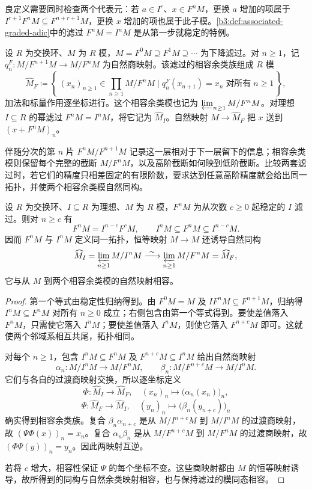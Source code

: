 良定义需要同时检查两个代表元：若 \(a\in I^r\)、\(x\in F^nM\)，更换 \(a\) 增加的项属于 \(I^{r+1}F^nM\subseteq F^{n+r+1}M\)，更换 \(x\) 增加的项也属于此子模。\cref{b3:def:associated-graded-adic}中的滤过 \(F^nM=I^nM\) 是从第一步就稳定的特例。

\begin{definition}\label{b3:def:filtered-completion}
	设 \(R\) 为交换环、\(M\) 为 \(R\) 模，\(M=F^0M\supseteq F^1M\supseteq\cdots\) 为下降滤过。对 \(n\ge1\)，记 \(q^F_n:M/F^{n+1}M\rightarrow M/F^nM\) 为自然商映射。该滤过的相容余类族组成 \(R\) 模
	\[
		\widehat M_F\coloneqq \left\{\,(x_n)_{n\ge1}\in\prod_{n\ge1}M/F^nM \mid q^F_n(x_{n+1})=x_n\;\text{对所有}\;n\ge1\,\right\},
	\]
	加法和标量作用逐坐标进行。这个相容余类模也记为 \(\varprojlim_{n\ge1}M/F^nM\)。对理想 \(I\subseteq R\) 的幂滤过 \(F^nM=I^nM\)，将它记为 \(\widehat M_I\)。自然映射 \(M\rightarrow\widehat M_F\) 把 \(x\) 送到 \((x+F^nM)_n\)。
\end{definition}

伴随分次的第 \(n\) 片 \(F^nM/F^{n+1}M\) 记录这一层相对于下一层留下的信息；相容余类模则保留每个完整的截断 \(M/F^nM\)，以及高阶截断如何映到低阶截断。比较两套滤过时，若它们的精度只相差固定的有限阶数，要求达到任意高阶精度就会给出同一拓扑，并使两个相容余类模自然同构。

\begin{proposition}\label{b3:prop:stable-filtration-equivalent}
	设 \(R\) 为交换环、\(I\subseteq R\) 为理想、\(M\) 为 \(R\) 模，\(F^nM\) 为从次数 \(c\ge0\) 起稳定的 \(I\) 滤过。则对 \(n\ge c\) 有
	\[
		F^nM=I^{n-c}F^cM,\qquad I^nM\subseteq F^nM\subseteq I^{n-c}M.
	\]
	因而 \(F^nM\) 与 \(I^nM\) 定义同一拓扑，恒等映射 \(M\rightarrow M\) 还诱导自然同构
	\[
		\widehat M_I=\varprojlim_{n\ge1}M/I^nM \xrightarrow{\ \sim\ }\varprojlim_{n\ge1}M/F^nM=\widehat M_F,
	\]
	它与从 \(M\) 到两个相容余类模的自然映射相容。
\end{proposition}
\begin{proof}
	第一个等式由稳定性归纳得到。由 \(F^0M=M\) 及 \(IF^nM\subseteq F^{n+1}M\)，归纳得 \(I^nM\subseteq F^nM\) 对所有 \(n\ge0\) 成立；右侧包含由第一个等式得到。要使差值落入 \(F^nM\)，只需使它落入 \(I^nM\)；要使差值落入 \(I^nM\)，则使它落入 \(F^{n+c}M\) 即可。这就使两个邻域系相互共尾，拓扑相同。

	对每个 \(n\ge1\)，包含 \(I^nM\subseteq F^nM\) 及 \(F^{n+c}M\subseteq I^nM\) 给出自然商映射
	\[
		\alpha_n:M/I^nM\longrightarrow M/F^nM, \qquad \beta_n:M/F^{n+c}M\longrightarrow M/I^nM.
	\]
	它们与各自的过渡商映射交换，所以逐坐标定义
	\[
		\Phi:\widehat M_I\longrightarrow\widehat M_F, \quad (x_n)_n\longmapsto\bigl(\alpha_n(x_n)\bigr)_n,
	\]
	\[
		\Psi:\widehat M_F\longrightarrow\widehat M_I, \quad (y_n)_n\longmapsto\bigl(\beta_n(y_{n+c})\bigr)_n
	\]
	确实得到相容余类族。复合 \(\beta_n\alpha_{n+c}\) 是从 \(M/I^{n+c}M\) 到 \(M/I^nM\) 的过渡商映射，故 \((\Psi\Phi(x))_n=x_n\)。复合 \(\alpha_n\beta_n\) 是从 \(M/F^{n+c}M\) 到 \(M/F^nM\) 的过渡商映射，故 \((\Phi\Psi(y))_n=y_n\)。因此两映射互逆。

	若将 \(c\) 增大，相容性保证 \(\Psi\) 的每个坐标不变。这些商映射都由 \(M\) 的恒等映射诱导，故所得到的同构与自然余类映射相容，也与保持滤过的模同态相容。
\end{proof}

